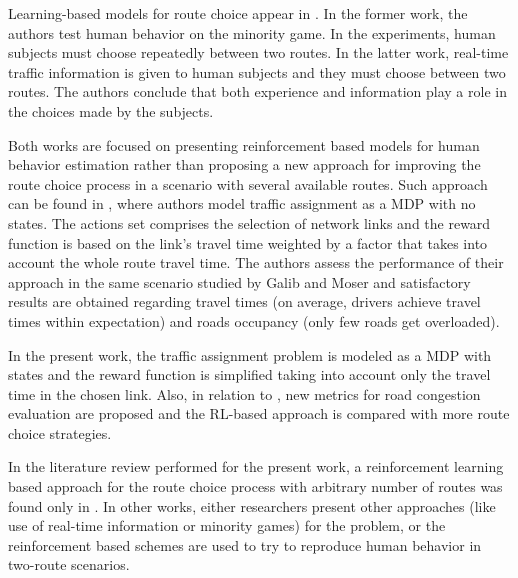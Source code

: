 \documentclass{RITA}
\begin{document}

Learning-based models for route choice appear in \cite{Chmura&Pitz2007,Ben-Elia&Shiftan2010}. In the former work, the authors test human behavior on the minority game. In the experiments, human subjects must choose repeatedly between two routes.  In the latter work, real-time traffic information is given to human subjects and they must choose between two routes. The authors conclude that both experience and information play a role in the choices made by the subjects.

Both works are focused on presenting reinforcement based models for human behavior estimation rather than proposing a new approach for improving the route choice process in a scenario with several available routes. Such approach can be found in \cite{Tavares&Bazzan2012}, where authors model traffic assignment as a MDP with no states. The actions set comprises the selection of network links and the reward function is based on the link's travel time weighted by a factor that takes into account the whole route travel time. The authors assess the performance of their approach in the same scenario studied by Galib and Moser \cite{Galib&Moser2011} and satisfactory results are obtained regarding travel times (on average, drivers achieve travel times within expectation) and roads occupancy (only few roads get overloaded). 

In the present work, the traffic assignment problem is modeled as a MDP with states and the reward function is simplified taking into account only the travel time in the chosen link. Also, in relation to \cite{Tavares&Bazzan2012}, new metrics for road congestion evaluation are proposed and the RL-based approach is compared with more route choice strategies. %

In the literature review performed for the present work, a reinforcement learning based approach for the route choice process with arbitrary number of routes was found only in \cite{Tavares&Bazzan2012}. In other works, either researchers present other approaches (like use of real-time information or minority games) for the problem, or the reinforcement based schemes are used to try to reproduce human behavior in two-route scenarios.
\end{document}
